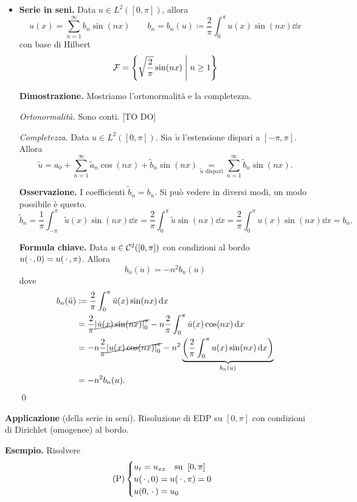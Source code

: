\begin{itemize}
	\item \textbf{Serie in seni.} Data $u \in L^2([0,\pi])$, allora 
	$$
		u(x) = \sum_{n=1}^\infty b_n \sin(nx) \qquad 
		b_n = b_n(u) \coloneqq  \frac{2}{\pi} \int_0^\pi u(x) \sin(nx) \dd x
	$$
	con base di Hilbert 
	$$
		\mathcal{F} = \left\{ \sqrt{\frac{2}{\pi}} \sin(nx) \;\middle|\; n \geq 1 \right\}
	$$

	\textbf{Dimostrazione.} Mostriamo l'ortonormalità e la completezza.

	\textit{Ortonormalità.} Sono conti. [TO DO]

	\textit{Completezza.} Data $u \in L^2([0,\pi])$. Sia $\tilde{u}$ l'estensione dispari a $[-\pi,\pi]$. Allora 
	$$
		\tilde{u} = a_0 + \sum_{n=1}^{\infty} \tilde{a}_n \cos(nx) + \tilde{b}_n \sin(nx)
		\underset{\tilde{u} \text{ dispari}} = \sum_{n=1}^{\infty} \tilde{b}_n \sin(nx).
	$$

	\textbf{Osservazione.} I coefficienti $\tilde{b}_n = b_n$. Si può vedere in diversi modi, un modo possibile è questo.
	$$
		\tilde{b}_n = \frac{1}{\pi} \int_{-\pi}^{\pi} \tilde{u}(x) \sin(nx) \dd x 
		= \frac{2}{\pi} \int_{0}^{\pi} \tilde{u} \sin(nx) \dd x 
		= \frac{2}{\pi} \int_{0}^{\pi} u(x) \sin(nx) \dd x 
		= b_n.
	$$

	\textbf{Formula chiave.} Data $u \in \mathcal{C}^2 ([0,\pi])$ con condizioni al bordo $u(\,\cdot\,, 0) = u(\,\cdot\,, \pi)$. 
	Allora
	$$
		b_n(\ddot u) = -n^2 b_n(u)
	$$
	dove 
	\begin{align*}
		b_n(\ddot u) & \coloneqq \frac{2}{\pi} \int_0^\pi \ddot u(x) \sin(nx) \,\mathrm{d} x \\
		& = \frac{2}{\pi} \cancel{\left| \dot u(x) \sin(nx) \right|_0^\pi} - n\frac{2}{\pi} \int_{0}^{\pi} \dot u(x) \cos(nx) \,\mathrm{d} x \\
		& = -n \frac{2}{\pi} \cancel{\left| u(x) \cos(nx) \right|_0^\pi} - n^2  \underbrace{\left( \frac{2}{\pi} \int_{0}^{\pi} u(x) \sin(nx) \,\mathrm{d} x \right)}_{b_n(u)} \\
		& = -n^2 b_n(u).
	\end{align*}
	\qed

\end{itemize}


\textbf{Applicazione} (della serie in seni). Risoluzione di EDP su $[0,\pi]$ con condizioni di Dirichlet (omogenee) al bordo.

\textbf{Esempio.} Risolvere
%
\begin{equation}
\label{eq:24nov-problema-1} \tag{P}
	\begin{cases}
		u_t = u_{xx} \quad \text{su} \;\; [0,\pi] \\
		u(\,\cdot\,, 0) = u(\,\cdot\,,\pi) = 0 \\
		u(0,\,\cdot\,) = u_0
	\end{cases} 
\end{equation}

